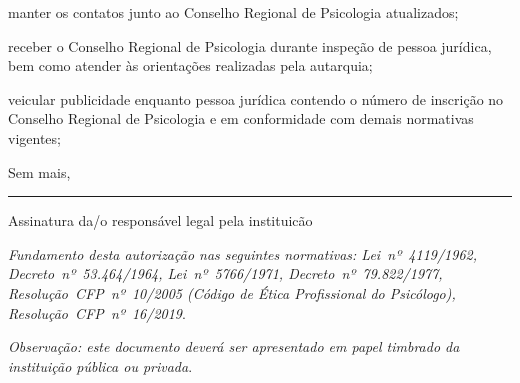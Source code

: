 \documentclass[openright, oneside, a4paper, article, 10pt, brazil]{abntex2}
\begin{document}
\begin{minipage}[c]{\boxlarg}
\CheckBox[%
    name=contatos,
    bordercolor=black,
    height=12pt,
    width=12pt]
    {\null}
\end{minipage}%
\begin{minipage}[c]{\linewidth-1.72\boxlarg}
manter os contatos junto ao Conselho Regional de Psicologia atualizados;
\end{minipage}\vspace{\baselineskip}

\begin{minipage}[c]{\boxlarg}
\CheckBox[%
    name=inspecao,
    bordercolor=black,
    height=12pt,
    width=12pt]
    {\null}
\end{minipage}%
\begin{minipage}[c]{\linewidth-1.72\boxlarg}
receber o Conselho Regional de Psicologia durante inspeção de pessoa jurídica, bem como atender às orientações
realizadas pela autarquia;
\end{minipage}\vspace{\baselineskip}

\begin{minipage}[c]{\boxlarg}
\CheckBox[%
    name=publicidade,
    bordercolor=black,
    height=12pt,
    width=12pt]
    {\null}
\end{minipage}%
\begin{minipage}[c]{\linewidth-1.72\boxlarg}
veicular publicidade enquanto pessoa jurídica contendo o número de inscrição no Conselho Regional de Psicologia
e em conformidade com demais normativas vigentes;
\end{minipage}\vspace{2\baselineskip}

\noindent Sem mais,
\vspace{3\baselineskip}

\vspace{6\baselineskip}

\rule{24em}{0.4pt}

\small Assinatura da/o responsável legal pela instituicão
\vfill

\raggedleft\scriptsize
\textit{Fundamento desta autorização nas seguintes normativas: Lei~nº~4119/1962, Decreto~nº~53.464/1964, Lei~nº~5766/1971,
Decreto~nº~79.822/1977, Resolução~CFP~nº~10/2005 (Código de Ética Profissional do Psicólogo), Resolução~CFP~nº~16/2019}.

\textit{Observação: este documento deverá ser apresentado em papel timbrado da instituição pública ou privada}.
\end{document}

